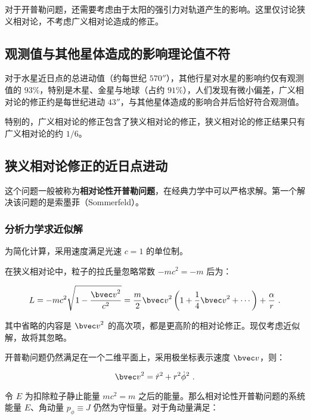 
\begin{issues}
\issueDraft
\end{issues}




对于开普勒问题，还需要考虑由于太阳的强引力对轨道产生的影响。这里仅讨论狭义相对论，不考虑广义相对论造成的修正。

\subsection{观测值与其他星体造成的影响理论值不符}
对于水星近日点的总进动值（约每世纪 $570''$），其他行星对水星的影响约仅有观测值的 $93 \%$，特别是木星、金星与地球（占约 $91\%$），人们发现有微小偏差，广义相对论的修正约是每世纪进动 $43''$，与其他星体造成的影响合并后恰好符合观测值。

特别的，广义相对论的修正包含了狭义相对论的修正，狭义相对论的修正结果只有广义相对论的约 $1/6$。

\subsection{狭义相对论修正的近日点进动}
这个问题一般被称为\textbf{相对论性开普勒问题}，在经典力学中可以严格求解。第一个解决该问题的是索墨菲（Sommerfeld）。

\subsubsection{分析力学求近似解}
为简化计算，采用速度满足光速 $c=1$ 的单位制。

在狭义相对论中，粒子的拉氏量忽略常数 $-mc^2 = -m$ 后为：

$$L = -mc^2 \sqrt{1- \frac{{\bvec v}^2}{c^2}} = \frac{m}{2} {\bvec v}^2 \left( 1+\frac{1}{4} {\bvec v}^2 + \cdots \right) + \frac{\alpha}{r} ~.$$

其中省略的内容是 ${\bvec v}^2$ 的高次项，都是更高阶的相对论修正。现仅考虑近似解，故将其忽略。

开普勒问题仍然满足在一个二维平面上，采用极坐标表示速度 $\bvec v$，则：

$${\bvec v}^2 = \dot r^2 + r^2 \dot \phi^2 ~.$$

令 $E$ 为扣除粒子静止能量 $mc^2 = m$ 之后的能量。那么相对论性开普勒问题的系统能量 $E$、角动量 $p_\phi \equiv J$ 仍然为守恒量。对于角动量满足：

